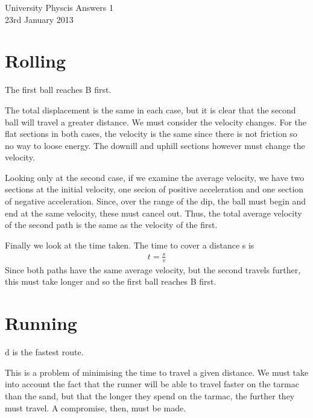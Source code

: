 
\makeatletter
\renewcommand{\@maketitle}{
\newpage
 \null
 \vskip 2em%
 \begin{center}%
  {\Large \@title \par}%
 \end{center}%
 \par} \makeatother

\begin{center}
\Huge University Physcis Answers 1\\[1em]
\large 23rd January 2013
\end{center}
\setcounter{section}{0}

\section{Rolling}
The first ball reaches B first.

The total displacement is the same in each case, but it is clear that the second ball will travel a greater distance. We must consider the velocity changes. For the flat sections in both cases, the velocity is the same since there is not friction so no way to loose energy. The downill and uphill sections however must change the velocity. 

Looking only at the second case, if we examine the average velocity, we have two sections at the initial velocity, one secion of positive acceleration and one section of negative acceleration. Since, over the range of the dip, the ball must begin and end at the same velocity, these must cancel out. Thus, the total average velocity of the second path is the same as the velocity of the first.

Finally we look at the time taken. The time to cover a distance s is
\begin{align*}
	t = \frac{s}{v}
\end{align*}
Since both paths have the same average velocity, but the second travels further, this must take longer and so the first ball reaches B first.

\section{Running}
d is the fastest route.

This is a problem of minimising the time to travel a given distance. We must take into account the fact that the runner will be able to travel faster on the tarmac than the sand, but that the longer they spend on the tarmac, the further they must travel. A compromise, then, must be made.

